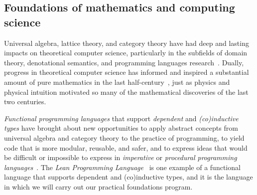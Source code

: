 \documentclass[11pt]{amsart}  %
\begin{document}
\subsection{Foundations of mathematics and computing science}
Universal algebra, lattice theory, and category theory have had deep and lasting impacts on theoretical computer science, particularly in the subfields of domain theory, denotational semantics, and programming languages research~\cite{MR2328298,MR1249550}. Dually, progress in theoretical computer science has informed and inspired a substantial amount of pure mathematics in the last half-century~\cite{MR3662915,MR3725758,MR2765040,MR3233442,MR1321662, MR1249550}, %
just as physics and physical intuition motivated so many of the mathematical discoveries of the last two centuries.


\emph{Functional programming languages} that support \emph{dependent} and \emph{(co)inductive types} have brought about new opportunities to apply abstract concepts from universal algebra and category theory to the practice of programming, to yield code that is more modular, reusable, and safer, and to express ideas that would be difficult or impossible to express in \emph{imperative} or \emph{procedural programming languages}~\cite[Chs. 5 \& 10]{baueroplss:2018,hughes:1989,chiusano:2014}. 
The \emph{Lean Programming Language}~\cite{lean} is one example of a functional language that supports dependent and (co)inductive types, and it is the language in which we will carry out our practical foundations program.
\end{document}
